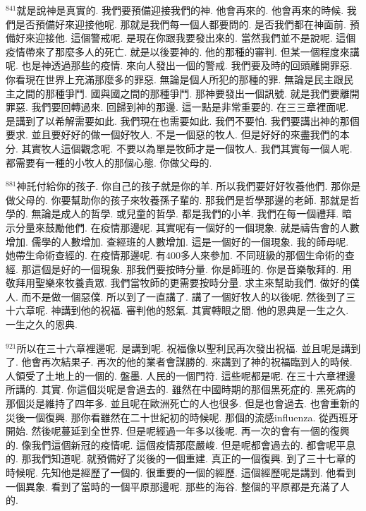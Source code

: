 \documentclass{book}
\begin{document}
$^{841}$就是說神是真實的.
我們要預備迎接我們的神.
他會再來的.
他會再來的時候.
我們是否預備好來迎接他呢.
那就是我們每一個人都要問的.
是否我們都在神面前.
預備好來迎接他.
這個警戒呢.
是現在你跟我要發出來的.
當然我們並不是說呢.
這個疫情帶來了那麼多人的死亡.
就是以後要神的.
他的那種的審判.
但某一個程度來講呢.
也是神透過那些的疫情.
來向人發出一個的警戒.
我們要及時的回頭離開罪惡.
你看現在世界上充滿那麼多的罪惡.
無論是個人所犯的那種的罪.
無論是民主跟民主之間的那種爭鬥.
國與國之間的那種爭鬥.
那神要發出一個訊號.
就是我們要離開罪惡.
我們要回轉過來.
回歸到神的那邊.
這一點是非常重要的.
在三三章裡面呢.
是講到了以希解需要如此.
我們現在也需要如此.
我們不要怕.
我們要講出神的那個要求.
並且要好好的做一個好牧人.
不是一個惡的牧人.
但是好好的來盡我們的本分.
其實牧人這個觀念呢.
不要以為單是牧師才是一個牧人.
我們其實每一個人呢.
都需要有一種的小牧人的那個心態.
你做父母的.

$^{881}$神託付給你的孩子.
你自己的孩子就是你的羊.
所以我們要好好牧養他們.
那你是做父母的.
你要幫助你的孩子來牧養孫子輩的.
那我們是哲學那邊的老師.
那就是哲學的.
無論是成人的哲學.
或兒童的哲學.
都是我們的小羊.
我們在每一個禮拜.
暗示分量來鼓勵他們.
在疫情那邊呢.
其實呢有一個好的一個現象.
就是禱告會的人數增加.
儒學的人數增加.
查經班的人數增加.
這是一個好的一個現象.
我的師母呢.
她帶生命術查經的.
在疫情那邊呢.
有400多人來參加.
不同班級的那個生命術的查經.
那這個是好的一個現象.
那我們要按時分量.
你是師班的.
你是音樂敬拜的.
用敬拜用聖樂來牧養貴眾.
我們當牧師的更需要按時分量.
求主來幫助我們.
做好的僕人.
而不是做一個惡僕.
所以到了一直講了.
講了一個好牧人的以後呢.
然後到了三十六章呢.
神講到他的祝福.
審判他的怒氣.
其實轉眼之間.
他的恩典是一生之久.
一生之久的恩典.

$^{921}$所以在三十六章裡邊呢.
是講到呢.
祝福像以聖利民再次發出祝福.
並且呢是講到了.
他會再次結果子.
再次的他的業者會謀勝的.
來講到了神的祝福臨到人的時候.
人領受了土地上的一個的.
盤墨.
人民的一個門符.
這些呢都是呢.
在三十六章裡邊所講的.
其實.
你這個災呢是會過去的.
雖然在中國時期的那個黑死症的.
黑死病的那個災是維持了四年多.
並且呢在歐洲死亡的人也很多.
但是也會過去.
也會重新的災後一個復興.
那你看雖然在二十世紀初的時候呢.
那個的流感influenza.
從西班牙開始.
然後呢蔓延到全世界.
但是呢經過一年多以後呢.
再一次的會有一個的復興的.
像我們這個新冠的疫情呢.
這個疫情那麼嚴峻.
但是呢都會過去的.
都會呢平息的.
那我們知道呢.
就預備好了災後的一個重建.
真正的一個復興.
到了三十七章的時候呢.
先知他是經歷了一個的.
很重要的一個的經歷.
這個經歷呢是講到.
他看到一個異象.
看到了當時的一個平原那邊呢.
那些的海谷.
整個的平原都是充滿了人的.
\end{document}
